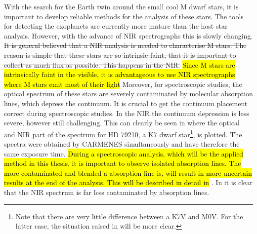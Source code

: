 With the search for the Earth twin around the small cool M dwarf stars, it is important to develop
reliable methods for the analysis of these stars. The tools for detecting the exoplanets are
currently more mature than the host star analysis. However, with the advance of NIR spectrographs
this is slowly changing. \st{It is general believed that a NIR analysis is needed to characterise M
stars. The reason is simple that these stars are so intrinsic faint, that it is important to collect
as much flux as possible. This happens in the NIR.} \hl{Since M stars are intrinsically faint in the
visible, it is advantageous to use NIR spectrographs where M stars emit most of their light}
Moreover, for spectroscopic studies, the optical spectrum of these stars are severely contaminated
by molecular absorption lines, which depress the continuum. It is crucial to get the continuum
placement correct during spectroscopic studies. In the NIR the continuum depression is less severe,
however still challenging. This can clearly be seen in  where the optical and
NIR part of the spectrum for HD 79210, a K7 dwarf star\footnote{Note that there are very little
difference between a K7V and M0V. For the latter case, the situation raised in
 will be more clear.}, is plotted. The spectra were obtained by CARMENES
simultaneously and have therefore the same exposure time. \hl{During a spectroscopic analysis, which
will be the applied method in this thesis, it is important to observe isolated absorption lines. The
more contaminated and blended a absorption line is, will result in more uncertain results at the end
of the analysis. This will be described in detail in} . In
 it is clear that the NIR spectrum is far less contaminated by absorption
lines.

